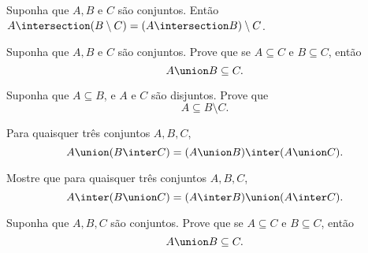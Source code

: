 \begin{exercise}
	Suponha que $A, B$ e $C$ são conjuntos. Então $A \intersection (B \setminus C) = (A \intersection B) \setminus C$.
\end{exercise}

\begin{exercise}
	Suponha que $A, B$ e $C$ são conjuntos. Prove que se $A \subseteq C$ e $B \subseteq C$, então 
    $$
        A \union B \subseteq C.
    $$
\end{exercise}

\begin{exercise}
    Suponha que $A \subseteq B$, e $A$ e $C$ são disjuntos. Prove que 
    $$
        A \subseteq B \setminus C.
    $$
\end{exercise}

\begin{exercise}
    Para quaisquer três conjuntos $A, B, C$, 
    $$
        A \union (B \inter C) = (A \union B) \inter (A \union C).
    $$
\end{exercise}

\begin{homework}
    Mostre que para quaisquer três conjuntos $A, B, C$, 
    $$ 
        A \inter (B \union C) = (A \inter B) \union (A \inter C).
    $$
\end{homework}

\begin{homework}
    Suponha que $A,B,C$ são conjuntos. Prove que se $A \subseteq C$ e $B \subseteq C$, então 
    $$
        A \union B \subseteq C.
    $$
\end{homework}
